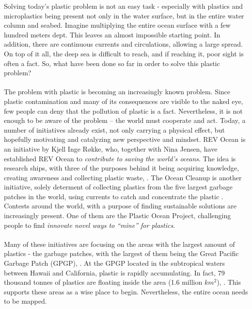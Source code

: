\noindent
Solving today’s plastic problem is not an easy task - especially with plastics and microplastics being present not only in the water surface, but in the entire water column and seabed. Imagine multiplying the entire ocean surface with a few hundred meters dept. This leaves an almost impossible starting point. In addition, there are continuous currents and circulations, allowing a large spread. On top of it all, the deep sea is difficult to reach, and if reaching it, poor sight is often a fact. So, what have been done so far in order to solve this plastic problem?
\\\\
The problem with plastic is becoming an increasingly known problem. Since plastic contamination and many of its consequences are visible to the naked eye, few people can deny that the pollution of plastic is a fact. Nevertheless, it is not enough to be aware of the problem – the world must cooperate and act. Today, a number of initiatives already exist, not only carrying a physical effect, but hopefully motivating and catalyzing new perspective and mindset. REV Ocean is an initiative by Kjell Inge R{\o}kke, who, together with Nina Jensen, have established REV Ocean to \textit{contribute to saving the world’s oceans}. The idea is research ships, with three of the purposes behind it being acquiring knowledge, creating awareness and collecting plastic waste, \cite{revocean_2018}. The Ocean Cleanup is another initiative, solely determent of collecting plastics from the five largest garbage patches in the world, using currents to catch and concentrate the plastic \cite{the_ocean_cleanup}. Contests around the world, with a purpose of finding sustainable solutions are increasingly present. One of them are the Plastic Ocean Project, challenging people to find \textit{innovate novel ways to “mine” for plastics}.
\\\\
Many of these initiatives are focusing on the areas with the largest amount of plastics - the garbage patches, with the largest of them being the Great Pacific Garbage Patch (GPGP), \cite{the_ocean_cleanup}. At the GPGP located in the subtropical waters between Hawaii and California, plastic is rapidly accumulating. In fact, 79 thousand tonnes of plastics are floating inside the area (1.6 million $km^2$), \cite{lebreton_slat_ferrari_sainte-rose_2018}. This supports these areas as a wise place to begin. Nevertheless, the entire ocean needs to be mapped. %

